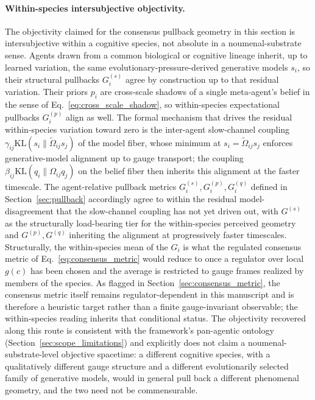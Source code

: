 \documentclass[11pt]{article}
\begin{document}
\paragraph{Within-species intersubjective objectivity.}
The objectivity claimed for the consensus pullback geometry in this section is intersubjective within a cognitive species, not absolute in a noumenal-substrate sense. Agents drawn from a common biological or cognitive lineage inherit, up to learned variation, the same evolutionary-pressure-derived generative models $s_i$, so their structural pullbacks $G^{(s)}_i$ agree by construction up to that residual variation. Their priors $p_i$ are cross-scale shadows of a single meta-agent's belief in the sense of Eq.~\eqref{eq:cross_scale_shadow}, so within-species expectational pullbacks $G^{(p)}_i$ align as well. The formal mechanism that drives the residual within-species variation toward zero is the inter-agent slow-channel coupling $\gamma_{ij}\mathrm{KL}(s_i \| \tilde\Omega_{ij} s_j)$ of the model fiber, whose minimum at $s_i = \tilde\Omega_{ij} s_j$ enforces generative-model alignment up to gauge transport; the coupling $\beta_{ij}\mathrm{KL}(q_i \| \Omega_{ij} q_j)$ on the belief fiber then inherits this alignment at the faster timescale. The agent-relative pullback metrics $G_i^{(s)}, G_i^{(p)}, G_i^{(q)}$ defined in Section~\ref{sec:pullback} accordingly agree to within the residual model-disagreement that the slow-channel coupling has not yet driven out, with $G^{(s)}$ as the structurally load-bearing tier for the within-species perceived geometry and $G^{(p)}, G^{(q)}$ inheriting the alignment at progressively faster timescales. Structurally, the within-species mean of the $G_i$ is what the regulated consensus metric of Eq.~\eqref{eq:consensus_metric} would reduce to once a regulator over local $g(c)$ has been chosen and the average is restricted to gauge frames realized by members of the species. As flagged in Section~\ref{sec:consensus_metric}, the consensus metric itself remains regulator-dependent in this manuscript and is therefore a heuristic target rather than a finite gauge-invariant observable; the within-species reading inherits that conditional status. The objectivity recovered along this route is consistent with the framework's pan-agentic ontology (Section~\ref{sec:scope_limitations}) and explicitly does not claim a noumenal-substrate-level objective spacetime: a different cognitive species, with a qualitatively different gauge structure and a different evolutionarily selected family of generative models, would in general pull back a different phenomenal geometry, and the two need not be commensurable.
\end{document}
